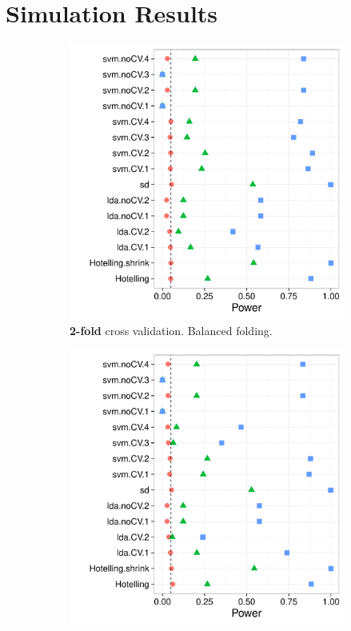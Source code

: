 \documentclass[12pt,a4paper]{article}
\theoremstyle{definition}
\newcommand{\mycaption}{Simulation details in Appendix~\ref{apx:simulation_details} except the changes in the sub-captions.}
\begin{document}
\newpage

\section{Simulation Results}
\label{apx:simulations}



\begin{figure}[h]
\centering
\caption{\mycaption}	
\label{fig:n_folds}
	\begin{subfigure}{.5\textwidth}
	  \centering
	  \includegraphics[width=1\linewidth]{"art/2016-07-27 21:21:12"}
	  \caption{\textbf{2-fold} cross validation. Balanced folding.}  
	\label{fig:n_folds_1}
	\end{subfigure}%
	\begin{subfigure}{.5\textwidth}
	  \centering
	  \includegraphics[width=1\linewidth]{"art/2016-07-29 07:18:24"}

\end{subfigure}
\end{figure}
\end{document}
